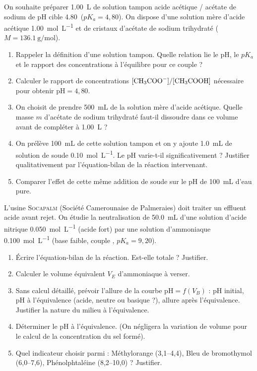 \documentclass[11pt]{article}
\begin{document}
\begin{exercice}
On souhaite préparer \SI{1,00}{\liter} de solution tampon acide acétique / acétate de sodium de pH cible \SI{4,80} ($pK_a = 4,80$). On dispose d'une solution mère d'acide acétique  \SI{1,00}{\mole\per\liter} et de cristaux d'acétate de sodium trihydraté  ($M = \SI{136,1}{\gram\per\mole}$).

\begin{enumerate}
    \item Rappeler la définition d'une solution tampon. Quelle relation lie le pH, le $pK_a$ et le rapport des concentrations à l'équilibre pour ce couple ?
    \item Calculer le rapport de concentrations $[\ce{CH3COO-}]/[\ce{CH3COOH}]$ nécessaire pour obtenir $\text{pH} = 4,80$.
    \item On choisit de prendre \SI{500}{\milli\liter} de la solution mère d'acide acétique. Quelle masse $m$ d'acétate de sodium trihydraté faut-il dissoudre dans ce volume avant de compléter à \SI{1,00}{\liter} ? 
    \item On prélève \SI{100}{\milli\liter} de cette solution tampon et on y ajoute \SI{1,0}{\milli\liter} de solution de soude \SI{0,10}{\mole\per\liter}. Le pH varie-t-il significativement ? Justifier qualitativement par l'équation-bilan de la réaction intervenant.
    \item Comparer l'effet de cette même addition de soude sur le pH de \SI{100}{\milli\liter} d'eau pure.
\end{enumerate}
\end{exercice}

\begin{exercice}
L'usine \textsc{Socapalm} (Société Camerounaise de Palmeraies) doit traiter un effluent acide avant rejet. On étudie la neutralisation de \SI{50,0}{\milli\liter} d'une solution d'acide nitrique  \SI{0,050}{\mole\per\liter} (acide fort) par une solution d'ammoniaque  \SI{0,100}{\mole\per\liter} (base faible, couple , $pK_a = 9,20$).

\begin{enumerate}
    \item Écrire l'équation-bilan de la réaction. Est-elle totale ? Justifier.
    \item Calculer le volume équivalent $V_{E}$ d'ammoniaque à verser.
    \item Sans calcul détaillé, prévoir l'allure de la courbe $\text{pH} = f(V_B)$ : pH initial, pH à l'équivalence (acide, neutre ou basique ?), allure après l'équivalence. Justifier la nature du milieu à l'équivalence.
    \item Déterminer le pH à l'équivalence. (On négligera la variation de volume pour le calcul de la concentration du sel formé).
    \item Quel indicateur choisir parmi : Méthylorange (3,1--4,4), Bleu de bromothymol (6,0--7,6), Phénolphtaléine (8,2--10,0) ? Justifier.
\end{enumerate}
\end{exercice}
\end{document}
